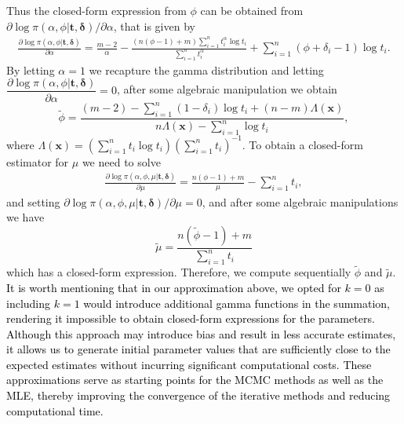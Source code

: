 \documentclass[]{interact}
\newcommand{\bs}{\boldsymbol}
\theoremstyle{plain}%
\theoremstyle{definition}
\theoremstyle{remark}
\begin{document}
Thus the closed-form expression from $\phi$ can be obtained from ${\partial \log \pi(\alpha,\phi|\bs{t,\delta})}{/ \partial \alpha}$, that is given by
\begin{equation*}
\begin{aligned} \frac{\partial \log \pi(\alpha,\phi|\bs{t,\delta})}{\partial \alpha} = \frac{m-2}{\alpha} - \frac{(n(\phi-1)+m)\sum_{i=1}^n t_i^{\alpha}\log t_i}{\sum_{i=1}^n t_i^\alpha} + \sum_{i=1}^n (\phi+\delta_i-1) \log t_i.
\end{aligned}
\end{equation*}
By letting $\alpha=1$ we recapture the gamma distribution and letting $\dfrac{\partial\log \pi(\alpha,\phi|\bs{t,\delta})}{\partial \alpha}=0$, after some algebraic manipulation we obtain
\begin{equation}\label{init1} 
\tilde{\phi} = \frac{(m-2) - \sum_{i=1}^n(1-\delta_i)\log t_i + (n-m)\Lambda(\bs{x}) }{n\Lambda(\bs{x})-\sum_{i=1}^n \log t_i}, 
\end{equation}
where $\Lambda(\bs{x}) = \left(\sum_{i=1}^n t_i\log t_i\right)\left(\sum_{i=1}^n t_i\right)^{-1}$. To obtain a closed-form estimator for $\mu$ we need to solve 
\begin{equation*}
\begin{aligned}
\frac{\partial \log \pi(\alpha,\phi,\mu|\bs{t,\delta})}{\partial \mu} = \frac{ n(\phi-1)+m}{\mu} -  \sum_{i=1}^n t_i,
\end{aligned}
\end{equation*}
and setting $\partial \log \pi(\alpha,\phi,\mu|\bs{t,\delta})/\partial \mu=0$, and after some algebraic manipulations we have
\begin{equation}\label{init2}
\tilde{\mu} = \frac{n(\tilde{\phi}-1)+m}{\sum_{i=1}^n t_i}
\end{equation}
which has a closed-form expression. Therefore, we compute sequentially $\tilde{\phi}$ and $\tilde{\mu}$. \textcolor{black}{It is worth mentioning that in our approximation above, we opted for \( k=0 \) as including \( k=1 \) would introduce additional gamma functions in the summation, rendering it impossible to obtain closed-form expressions for the parameters. Although this approach may introduce bias and result in less accurate estimates, it allows us to generate initial parameter values that are sufficiently close to the expected estimates without incurring significant computational costs. These approximations serve as starting points for the MCMC methods as well as the MLE, thereby improving the convergence of the iterative methods and reducing computational time. }
\end{document}
